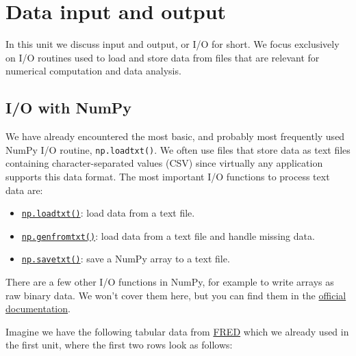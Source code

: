 \documentclass[10pt]{scrartcl}
\providecommand{\tightlist}{%
      \setlength{\itemsep}{0pt}\setlength{\parskip}{0pt}}
\begin{document}
    
    \maketitle
    \tableofcontents

    

    
    \hypertarget{data-input-and-output}{%
\section{Data input and output}\label{data-input-and-output}}

In this unit we discuss input and output, or I/O for short. We focus
exclusively on I/O routines used to load and store data from files that
are relevant for numerical computation and data analysis.

    \hypertarget{io-with-numpy}{%
\subsection{I/O with NumPy}\label{io-with-numpy}}

We have already encountered the most basic, and probably most frequently
used NumPy I/O routine, \texttt{np.loadtxt()}. We often use files that
store data as text files containing character-separated values (CSV)
since virtually any application supports this data format. The most
important I/O functions to process text data are:

\begin{itemize}
\tightlist
\item
  \href{https://numpy.org/doc/stable/reference/generated/numpy.loadtxt.html}{\texttt{np.loadtxt()}}:
  load data from a text file.
\item
  \href{https://numpy.org/doc/stable/reference/generated/numpy.genfromtxt.html}{\texttt{np.genfromtxt()}}:
  load data from a text file and handle missing data.
\item
  \href{https://numpy.org/doc/stable/reference/generated/numpy.savetxt.html}{\texttt{np.savetxt()}}:
  save a NumPy array to a text file.
\end{itemize}

There are a few other I/O functions in NumPy, for example to write
arrays as raw binary data. We won't cover them here, but you can find
them in the
\href{https://numpy.org/doc/stable/reference/routines.io.html}{official
documentation}.

Imagine we have the following tabular data from
\href{https://fred.stlouisfed.org/}{FRED} which we already used in the
first unit, where the first two rows look as follows:
\end{document}
